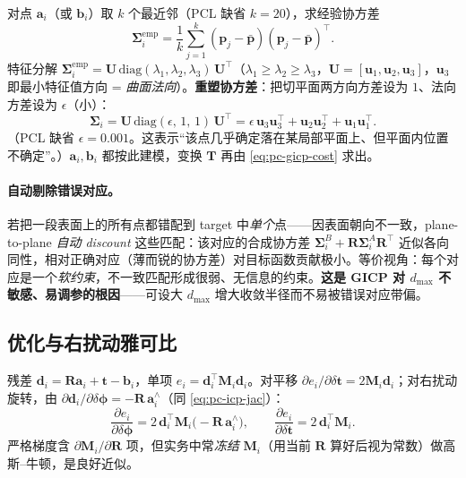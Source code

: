 \begin{derivation}
对点 $\mathbf{a}_i$（或 $\mathbf{b}_i$）取 $k$ 个最近邻（PCL 缺省 $k=20$），求经验协方差
\begin{equation}
  \boldsymbol{\Sigma}_i^{\text{emp}}=\frac{1}{k}\sum_{j=1}^{k}(\mathbf{p}_j-\bar{\mathbf{p}})(\mathbf{p}_j-\bar{\mathbf{p}})^\top.
  \label{eq:pc-gicp-emp}
\end{equation}
特征分解 $\boldsymbol{\Sigma}_i^{\text{emp}}=\mathbf{U}\,\mathrm{diag}(\lambda_1,\lambda_2,\lambda_3)\,\mathbf{U}^\top$（$\lambda_1\ge\lambda_2\ge\lambda_3$，$\mathbf{U}=[\mathbf{u}_1,\mathbf{u}_2,\mathbf{u}_3]$，$\mathbf{u}_3$ 即最小特征值方向 = \emph{曲面法向}）。\textbf{重塑协方差}：把切平面两方向方差设为 $1$、法向方差设为 $\epsilon$（小）：
\begin{equation}
  \boldsymbol{\Sigma}_i=\mathbf{U}\,\mathrm{diag}(\epsilon,\,1,\,1)\,\mathbf{U}^\top
  =\epsilon\,\mathbf{u}_3\mathbf{u}_3^\top+\mathbf{u}_2\mathbf{u}_2^\top+\mathbf{u}_1\mathbf{u}_1^\top.
  \label{eq:pc-gicp-cov}
\end{equation}
（PCL 缺省 $\epsilon=0.001$。这表示“该点几乎确定落在某局部平面上、但平面内位置不确定”。）$\mathbf{a}_i,\mathbf{b}_i$ 都按此建模，变换 $\mathbf{T}$ 再由 \cref{eq:pc-gicp-cost} 求出。
\end{derivation}

\paragraph{自动剔除错误对应。}
若把一段表面上的所有点都错配到 target 中\emph{单个}点——因表面朝向不一致，plane-to-plane \emph{自动 discount} 这些匹配：该对应的合成协方差 $\boldsymbol{\Sigma}_i^B+\mathbf{R}\boldsymbol{\Sigma}_i^A\mathbf{R}^\top$ 近似各向同性，相对正确对应（薄而锐的协方差）对目标函数贡献极小。等价视角：每个对应是一个\emph{软约束}，不一致匹配形成很弱、无信息的约束。\textbf{这是 GICP 对 $d_{\max}$ 不敏感、易调参的根因}——可设大 $d_{\max}$ 增大收敛半径而不易被错误对应带偏。

\subsection{优化与右扰动雅可比}
\label{sec:pc-gicp-opt}

残差 $\mathbf{d}_i=\mathbf{R}\mathbf{a}_i+\mathbf{t}-\mathbf{b}_i$，单项 $e_i=\mathbf{d}_i^\top\mathbf{M}_i\mathbf{d}_i$。对平移 $\partial e_i/\partial\delta\mathbf{t}=2\mathbf{M}_i\mathbf{d}_i$；对右扰动旋转，由 $\partial\mathbf{d}_i/\partial\delta\boldsymbol{\phi}=-\mathbf{R}\,\mathbf{a}_i^\wedge$（同 \cref{eq:pc-icp-jac}）：
\begin{equation}
  \frac{\partial e_i}{\partial\delta\boldsymbol{\phi}}=2\,\mathbf{d}_i^\top\mathbf{M}_i\big(-\mathbf{R}\,\mathbf{a}_i^\wedge\big),\qquad
  \frac{\partial e_i}{\partial\delta\mathbf{t}}=2\,\mathbf{d}_i^\top\mathbf{M}_i.
  \label{eq:pc-gicp-jac}
\end{equation}
严格梯度含 $\partial\mathbf{M}_i/\partial\mathbf{R}$ 项，但实务中常\emph{冻结} $\mathbf{M}_i$（用当前 $\mathbf{R}$ 算好后视为常数）做高斯--牛顿，是良好近似。

